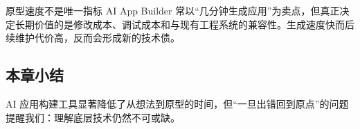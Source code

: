 \begin{warningbox}{原型速度不是唯一指标}
AI App Builder 常以“几分钟生成应用”为卖点，但真正决定长期价值的是修改成本、调试成本和与现有工程系统的兼容性。生成速度快而后续维护代价高，反而会形成新的技术债。
\end{warningbox}

\subsection{本章小结}

AI 应用构建工具显著降低了从想法到原型的时间，但``一旦出错回到原点''的问题提醒我们：理解底层技术仍然不可或缺。

